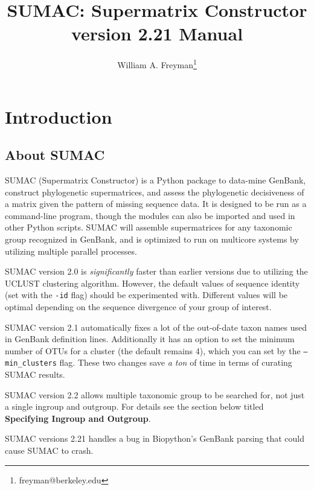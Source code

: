 \documentclass[10pt]{report}
\title{SUMAC: Supermatrix Constructor version 2.21 Manual}
\author{William A. Freyman\thanks{freyman@berkeley.edu}}
\affil{Department of Integrative Biology, University of California, Berkeley}
\date{}
\begin{document}
\maketitle

\tableofcontents


\chapter{Introduction}

\section{About SUMAC}

SUMAC (Supermatrix Constructor) is a Python package to 
data-mine GenBank, construct phylogenetic supermatrices, and assess the phylogenetic decisiveness of a matrix given the pattern of missing sequence data.
It is designed to be run as a command-line program, though
the modules can also be imported and used in other Python scripts.
SUMAC will assemble
supermatrices for any taxonomic group recognized in GenBank,
and is optimized to run on multicore systems by utilizing multiple parallel processes.

SUMAC version 2.0 is \textit{significantly} faster than earlier versions
due to utilizing the UCLUST clustering algorithm. However, the
default values of sequence identity (set with the \texttt{-id} flag)
should be experimented with. Different values will be optimal
depending on the sequence divergence of your group of interest.

SUMAC version 2.1 
automatically fixes a lot of the out-of-date taxon names used in GenBank definition lines. 
Additionally it has an option to set the minimum number of OTUs for a cluster (the default remains 4), 
which you can set by the \texttt{--min\_clusters} flag. 
These two changes save \textit{a ton} of time in terms of curating SUMAC results.

SUMAC version 2.2
allows multiple taxonomic group to be searched for,
not just a single ingroup and outgroup.
For details see the section below titled 
\textbf{Specifying Ingroup and Outgroup}.

SUMAC versions 2.21
handles a bug in Biopython's GenBank parsing that could cause
SUMAC to crash.
\end{document}
